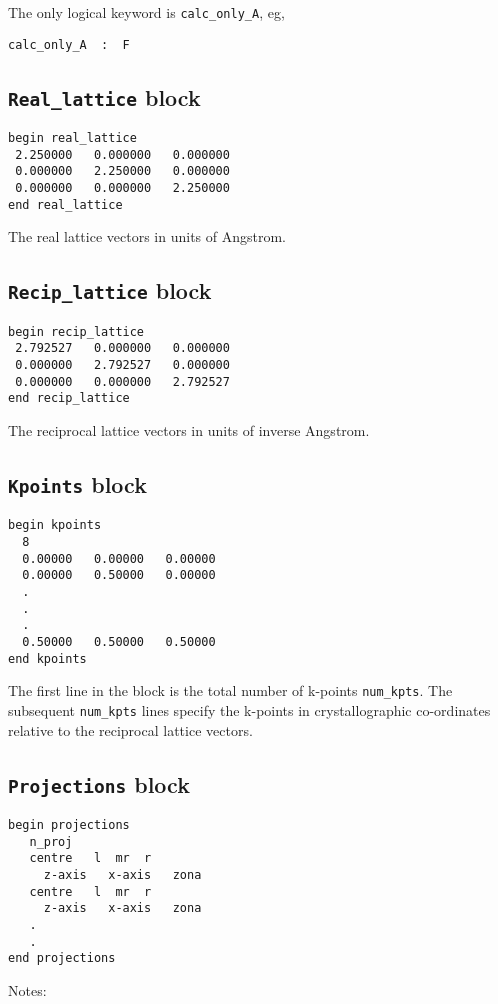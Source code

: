 \noindent 
The only logical keyword is \verb#calc_only_A#, eg,

\verb#calc_only_A  :  F#

\subsection{{\tt Real\_lattice} block}
\begin{verbatim}
begin real_lattice
 2.250000   0.000000   0.000000
 0.000000   2.250000   0.000000
 0.000000   0.000000   2.250000
end real_lattice
\end{verbatim}

The real lattice vectors in units of Angstrom.


\subsection{{\tt Recip\_lattice} block}
\begin{verbatim}
begin recip_lattice
 2.792527   0.000000   0.000000
 0.000000   2.792527   0.000000
 0.000000   0.000000   2.792527
end recip_lattice
\end{verbatim}

The reciprocal lattice vectors in units of inverse Angstrom.


\subsection{{\tt Kpoints} block}
\begin{verbatim}
begin kpoints
  8
  0.00000   0.00000   0.00000
  0.00000   0.50000   0.00000
  .
  .
  .
  0.50000   0.50000   0.50000
end kpoints
\end{verbatim}

The first line in the block is the total number of k-points
\verb#num_kpts#. The subsequent \verb#num_kpts# lines specify the
k-points in crystallographic co-ordinates relative to the reciprocal
lattice vectors.


\subsection{{\tt Projections} block}
\begin{verbatim}
begin projections
   n_proj
   centre   l  mr  r   
     z-axis   x-axis   zona
   centre   l  mr  r   
     z-axis   x-axis   zona
   .
   .
end projections
\end{verbatim}

\noindent
Notes:

